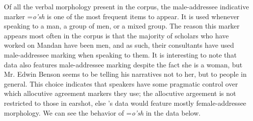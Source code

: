 
Of all the verbal morphology present in the corpus, the male-addressee indicative marker =\textit{o'sh} is one of the most frequent items to appear. It is used whenever speaking to a man, a group of men, or a mixed group. The reason this marker appears most often in the corpus is that the majority of scholars who have worked on Mandan have been men, and as such, their consultants have used male-addressee marking when speaking to them. It is interesting to note that  data also features male-addressee marking despite the fact she is a woman, but Mr. Edwin Benson seems to be telling his narratives not to her, but to people in general. This choice indicates that speakers have some pragmatic control over which allocutive agreement markers they use; the allocutive argeement is not restricted to those in earshot, else \citeauthor{trechter2012b}'s data would feature mostly female-addressee morphology. We can see the behavior of =\textit{o'sh} in the data below.

